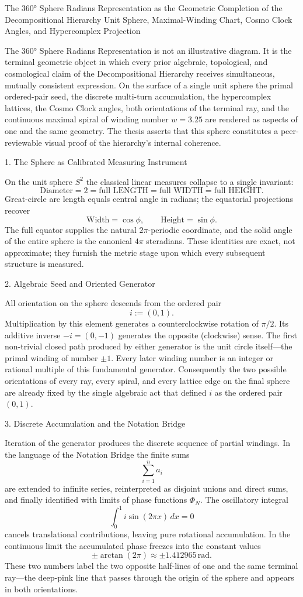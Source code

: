 The 360° Sphere Radians Representation as the Geometric Completion of the Decompositional Hierarchy  
Unit Sphere, Maximal-Winding Chart, Cosmo Clock Angles, and Hypercomplex Projection

The 360° Sphere Radians Representation is not an illustrative diagram. It is the terminal geometric object in which every prior algebraic, topological, and cosmological claim of the Decompositional Hierarchy receives simultaneous, mutually consistent expression. On the surface of a single unit sphere the primal ordered-pair seed, the discrete multi-turn accumulation, the hypercomplex lattices, the Cosmo Clock angles, both orientations of the terminal ray, and the continuous maximal spiral of winding number \(w=3.25\) are rendered as aspects of one and the same geometry. The thesis asserts that this sphere constitutes a peer-reviewable visual proof of the hierarchy’s internal coherence.

1. The Sphere as Calibrated Measuring Instrument

On the unit sphere \(S^2\) the classical linear measures collapse to a single invariant:
\[
\text{Diameter}=2=\text{full LENGTH}=\text{full WIDTH}=\text{full HEIGHT}.
\]
Great-circle arc length equals central angle in radians; the equatorial projections recover
\[
\text{Width}=\cos\phi,\qquad\text{Height}=\sin\phi.
\]
The full equator supplies the natural \(2\pi\)-periodic coordinate, and the solid angle of the entire sphere is the canonical \(4\pi\) steradians. These identities are exact, not approximate; they furnish the metric stage upon which every subsequent structure is measured.

2. Algebraic Seed and Oriented Generator

All orientation on the sphere descends from the ordered pair
\[
i:=(0,1).
\]
Multiplication by this element generates a counterclockwise rotation of \(\pi/2\). Its additive inverse \(-i=(0,-1)\) generates the opposite (clockwise) sense. The first non-trivial closed path produced by either generator is the unit circle itself—the primal winding of number \(\pm 1\). Every later winding number is an integer or rational multiple of this fundamental generator. Consequently the two possible orientations of every ray, every spiral, and every lattice edge on the final sphere are already fixed by the single algebraic act that defined \(i\) as the ordered pair \((0,1)\).

3. Discrete Accumulation and the Notation Bridge

Iteration of the generator produces the discrete sequence of partial windings. In the language of the Notation Bridge the finite sums
\[
\sum_{i=1}^n a_i
\]
are extended to infinite series, reinterpreted as disjoint unions and direct sums, and finally identified with limits of phase functions \(\Phi_N\). The oscillatory integral
\[
\int_0^1 i\sin(2\pi x)\,dx=0
\]
cancels translational contributions, leaving pure rotational accumulation. In the continuous limit the accumulated phase freezes into the constant values
\[
\pm\arctan(2\pi)\approx\pm 1.412965\,\text{rad}.
\]
These two numbers label the two opposite half-lines of one and the same terminal ray—the deep-pink line that passes through the origin of the sphere and appears in both orientations.

